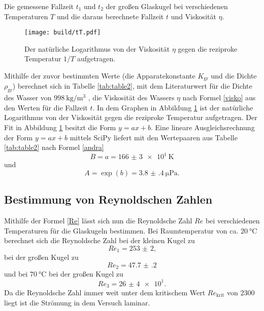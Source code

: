 \begin{table}
	\centering
	\caption{Die gemessene Fallzeit $t_1$ und $t_2$ der großen Glaskugel bei verschiedenen Temperaturen $T$ und die daraus berechnete Fallzeit $t$ und Viskosität $\eta$.}
	
\end{table}
\begin{figure}
	\centering
	\caption{Der natürliche Logarithmus von der Viskosität $\eta$ gegen die reziproke Temperatur $1/T$ aufgetragen.}
	\texttt{[image: build/tT.pdf]}
	\label{fig:Graph}
\end{figure}
Mithilfe der zuvor bestimmten Werte (die Apparatekonstante $K_\text{gr}$ und die Dichte $\rho_\text{gr}$) berechnet sich in Tabelle \ref{tab:table2}, mit dem Literaturwert für die Dichte des Wasser von $\SI{998}{\kilo\gram\per\meter\tothe{3}}$ \cite{eta}, die Viskosität des Wassers $\eta$ nach Formel \eqref{visko} aus den Werten für die Fallzeit $t$. In dem Graphen in Abbildung \ref{fig:Graph} ist der natürliche Logarithmus von der Viskosität gegen die reziproke Temperatur aufgetragen. 
Der Fit in Abbildung \ref{fig:Graph} besitzt die Form $y=a x + b$. Eine lineare Ausgleichsrechnung der Form $y=a x + b$ mittels SciPy \cite{scipy} liefert mit den Wertepaaren aus Tabelle \ref{tab:table2} nach Formel \eqref{andra}
\begin{displaymath}
	B = a = \SI{166(3)e1}{\kelvin}
\end{displaymath}
und
\begin{displaymath}
	A = \exp(b) = \SI{3.8(4)}{\micro\pascal}\text{.}
\end{displaymath}

\subsection{Bestimmung von Reynoldschen Zahlen}
Mithilfe der Formel \eqref{Re} lässt sich nun die Reynoldsche Zahl $Re$ bei verschiedenen Temperaturen für die Glaskugeln bestimmen. Bei Raumtemperatur von ca. $\SI{20}{\degreeCelsius}$ berechnet sich die Reynoldsche Zahl bei der kleinen Kugel zu
\begin{displaymath}
	Re_1 = \num{253(2)}\text{,}
\end{displaymath}
 bei der großen Kugel zu
\begin{displaymath}
	Re_2 = \num{47.7(2)}
\end{displaymath}
und bei $\SI{70}{\degreeCelsius}$ bei der großen Kugel zu
\begin{displaymath}
Re_3 = \num{26(4)e1}\text{.}
\end{displaymath}
Da die Reynoldsche Zahl immer weit unter dem kritischem Wert $Re_\text{krit}$ von $2300$ \cite{Rekrit} liegt ist die Strömung in dem Versuch laminar. 

